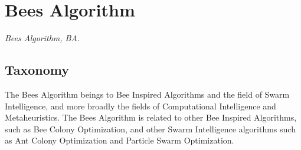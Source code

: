 

\section{Bees Algorithm} 
\label{sec:bees_algorithm}

\emph{Bees Algorithm, BA.}

\subsection{Taxonomy}
The Bees Algorithm beings to Bee Inspired Algorithms and the field of Swarm Intelligence, and more broadly the fields of Computational Intelligence and Metaheuristics.
The Bees Algorithm is related to other Bee Inspired Algorithms, such as Bee Colony Optimization, and other Swarm Intelligence algorithms such as Ant Colony Optimization and Particle Swarm Optimization.

